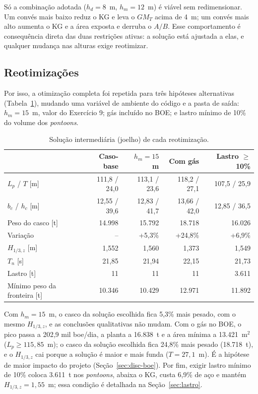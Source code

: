 \documentclass[11pt,a4paper]{article}
\newcommand{\Hz}{H_{1/3,z}}
\begin{document}
Só a combinação adotada ($h_d = 8$~m, $h_m = 12$~m) é viável sem redimensionar. Um convés mais
baixo reduz o KG e leva o $GM_T$ acima de 4~m; um convés mais alto aumenta o KG e a área exposta e
derruba o $A/B$. Esse comportamento é consequência direta das duas restrições ativas: a solução
está ajustada a elas, e qualquer mudança nas alturas exige reotimizar.

\subsection{Reotimizações}

Por isso, a otimização completa foi repetida para três hipóteses alternativas
(Tabela~\ref{tab:sensopt}), mudando uma variável de ambiente do código e a pasta de saída:
$h_m = 15$~m, valor do Exercício 9; gás incluído no BOE; e lastro mínimo de 10\% do volume dos
\emph{pontoons}.

\begin{table}[!htb]
\centering
\caption{Solução intermediária (joelho) de cada reotimização.}\label{tab:sensopt}
\small
\begin{tabular}{lrrrr}
\toprule
 & Caso-base & $h_m = 15$ m & Com gás & Lastro $\ge$ 10\% \\
\midrule
$L_p$ / $T$ [m] & 111,8 / 24,0 & 113,1 / 23,6 & 118,2 / 27,1 & 107,5 / 25,9 \\
$b_c$ / $h_c$ [m] & 12,55 / 39,6 & 12,83 / 41,7 & 13,66 / 42,0 & 12,85 / 36,5 \\
Peso do casco [t] & 14.998 & 15.792 & 18.718 & 16.026 \\
Variação & -- & +5,3\% & +24,8\% & +6,9\% \\
$\Hz$ [m] & 1,552 & 1,560 & 1,373 & 1,549 \\
$T_n$ [s] & 21,85 & 21,94 & 22,15 & 21,73 \\
Lastro [t] & 11 & 11 & 11 & 3.611 \\
Mínimo peso da fronteira [t] & 10.346 & 10.429 & 12.971 & 11.892 \\
\bottomrule
\end{tabular}
\end{table}

Com $h_m = 15$~m, o casco da solução escolhida fica 5,3\% mais pesado, com o mesmo $\Hz$, e as
conclusões qualitativas não mudam. Com o gás no BOE, o pico passa a 202,9 mil boe/dia, a planta a
16.838~t e a área mínima a 13.421~m$^2$ ($L_p \ge 115{,}85$~m); o casco da solução escolhida fica
24,8\% mais pesado (18.718~t), e o $\Hz$ cai porque a solução é maior e mais funda
($T = 27{,}1$~m). É a hipótese de maior impacto do projeto (Seção~\ref{sec:disc-boe}). Por fim, exigir
lastro mínimo de 10\% coloca 3.611~t nos \emph{pontoons}, abaixa o KG, custa 6,9\% de aço e mantém
$\Hz = 1{,}55$~m; essa condição é detalhada na Seção~\ref{sec:lastro}.
\end{document}
